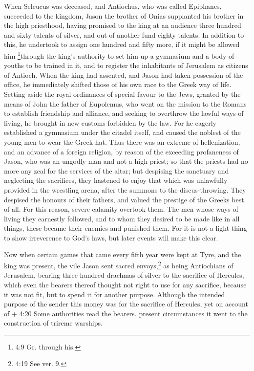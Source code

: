  When Seleucus was deceased, and Antiochus, who was called
Epiphanes, succeeded to the kingdom, Jason the brother of Onias
supplanted his brother in the high priesthood,  having
promised to the king at an audience three hundred and sixty talents of
silver, and out of another fund eighty talents.  In addition
to this, he undertook to assign one hundred and fifty more, if it might
be allowed him \footnote{4:9 Gr. through his.}through the king's
authority to set him up a gymnasium and a body of youths to be trained
in it, and to register the inhabitants of Jerusalem as citizens of
Antioch.  When the king had assented, and Jason had taken
possession of the office, he immediately shifted those of his own race
to the Greek way of life.  Setting aside the royal
ordinances of special favour to the Jews, granted by the means of John
the father of Eupolemus, who went on the mission to the Romans to
establish friendship and alliance, and seeking to overthrow the lawful
ways of living, he brought in new customs forbidden by the law.
 For he eagerly established a gymnasium under the citadel
itself, and caused the noblest of the young men to wear the Greek hat.
 Thus there was an extreme of hellenization, and an advance
of a foreign religion, by reason of the exceeding profaneness of Jason,
who was an ungodly man and not a high priest;  so that the
priests had no more any zeal for the services of the altar; but
despising the sanctuary and neglecting the sacrifices, they hastened to
enjoy that which was unlawfully provided in the wrestling arena, after
the summons to the discus-throwing.  They despised the
honours of their fathers, and valued the prestige of the Greeks best of
all.  For this reason, severe calamity overtook them. The
men whose ways of living they earnestly followed, and to whom they
desired to be made like in all things, these became their enemies and
punished them.  For it is not a light thing to show
irreverence to God's laws, but later events will make this clear.

 Now when certain games that came every fifth year were
kept at Tyre, and the king was present,  the vile Jason
sent sacred envoys,\footnote{4:19 See ver. 9.} as being Antiochians of
Jerusalem, bearing three hundred drachmas of silver to the sacrifice of
Hercules, which even the bearers thereof thought not right to use for
any sacrifice, because it was not fit, but to spend it for another
purpose.  Although the intended purpose of the sender this
money was for the sacrifice of Hercules, yet on account of + 4:20 Some
authorities read the bearers. present circumstances it went to the
construction of trireme warships.

